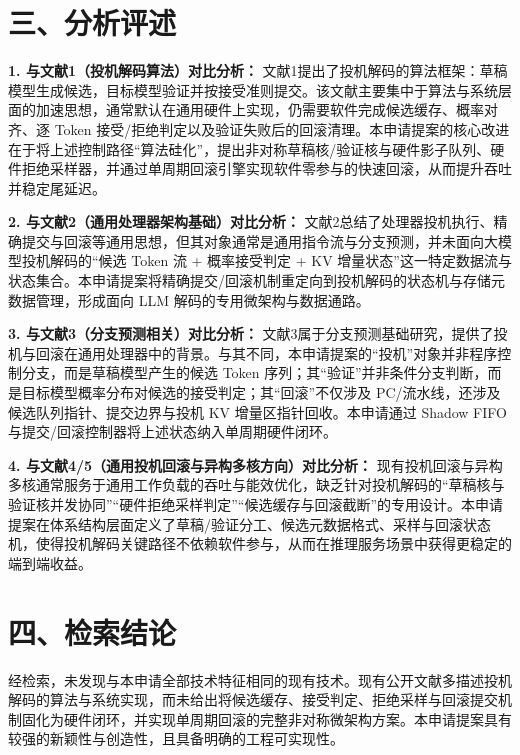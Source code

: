 \documentclass[12pt,a4paper]{article}
\begin{document}
\section*{三、分析评述}

\textbf{1. 与文献1（投机解码算法）对比分析：}
文献1提出了投机解码的算法框架：草稿模型生成候选，目标模型验证并按接受准则提交。该文献主要集中于算法与系统层面的加速思想，通常默认在通用硬件上实现，仍需要软件完成候选缓存、概率对齐、逐 Token 接受/拒绝判定以及验证失败后的回滚清理。本申请提案的核心改进在于将上述控制路径“算法硅化”，提出非对称草稿核/验证核与硬件影子队列、硬件拒绝采样器，并通过单周期回滚引擎实现软件零参与的快速回滚，从而提升吞吐并稳定尾延迟。

\textbf{2. 与文献2（通用处理器架构基础）对比分析：}
文献2总结了处理器投机执行、精确提交与回滚等通用思想，但其对象通常是通用指令流与分支预测，并未面向大模型投机解码的“候选 Token 流 + 概率接受判定 + KV 增量状态”这一特定数据流与状态集合。本申请提案将精确提交/回滚机制重定向到投机解码的状态机与存储元数据管理，形成面向 LLM 解码的专用微架构与数据通路。

\textbf{3. 与文献3（分支预测相关）对比分析：}
文献3属于分支预测基础研究，提供了投机与回滚在通用处理器中的背景。与其不同，本申请提案的“投机”对象并非程序控制分支，而是草稿模型产生的候选 Token 序列；其“验证”并非条件分支判断，而是目标模型概率分布对候选的接受判定；其“回滚”不仅涉及 PC/流水线，还涉及候选队列指针、提交边界与投机 KV 增量区指针回收。本申请通过 Shadow FIFO 与提交/回滚控制器将上述状态纳入单周期硬件闭环。

\textbf{4. 与文献4/5（通用投机回滚与异构多核方向）对比分析：}
现有投机回滚与异构多核通常服务于通用工作负载的吞吐与能效优化，缺乏针对投机解码的“草稿核与验证核并发协同”“硬件拒绝采样判定”“候选缓存与回滚截断”的专用设计。本申请提案在体系结构层面定义了草稿/验证分工、候选元数据格式、采样与回滚状态机，使得投机解码关键路径不依赖软件参与，从而在推理服务场景中获得更稳定的端到端收益。

\section*{四、检索结论}

经检索，未发现与本申请全部技术特征相同的现有技术。现有公开文献多描述投机解码的算法与系统实现，而未给出将候选缓存、接受判定、拒绝采样与回滚提交机制固化为硬件闭环，并实现单周期回滚的完整非对称微架构方案。本申请提案具有较强的新颖性与创造性，且具备明确的工程可实现性。
\end{document}
